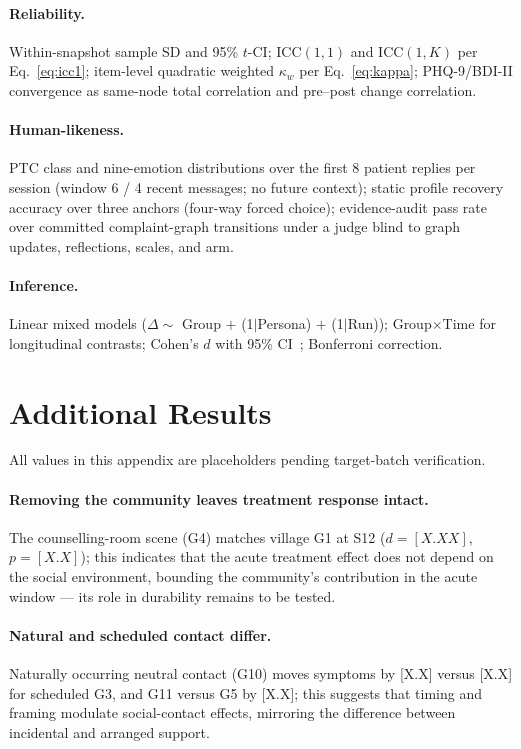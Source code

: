 \documentclass[10pt]{article}
\begin{document}
\paragraph{Reliability.}
Within-snapshot sample SD and 95\% $t$-CI; ICC$(1,1)$ and ICC$(1,K)$ per Eq.~\ref{eq:icc1}; item-level quadratic weighted $\kappa_w$ per Eq.~\ref{eq:kappa}; PHQ-9/BDI-II convergence as same-node total correlation and pre--post change correlation.

\paragraph{Human-likeness.}
PTC class and nine-emotion distributions over the first 8 patient replies per session (window 6 / 4 recent messages; no future context); static profile recovery accuracy over three anchors (four-way forced choice); evidence-audit pass rate over committed complaint-graph transitions under a judge blind to graph updates, reflections, scales, and arm.

\paragraph{Inference.}
Linear mixed models ($\Delta \sim$ Group $+$ (1$|$Persona) $+$ (1$|$Run)); Group$\times$Time for longitudinal contrasts; Cohen's $d$ with 95\% CI~\citep{cohen1988}; Bonferroni correction.

\section{Additional Results}\label{app:additional}

All values in this appendix are placeholders pending target-batch verification.

\paragraph{Removing the community leaves treatment response intact.}
The counselling-room scene (G4) matches village G1 at S12 ($d = [X.XX]$, $p = [X.X]$); this indicates that the acute treatment effect does not depend on the social environment, bounding the community's contribution in the acute window --- its role in durability remains to be tested.

\paragraph{Natural and scheduled contact differ.}
Naturally occurring neutral contact (G10) moves symptoms by [X.X] versus [X.X] for scheduled G3, and G11 versus G5 by [X.X]; this suggests that timing and framing modulate social-contact effects, mirroring the difference between incidental and arranged support.
\end{document}

